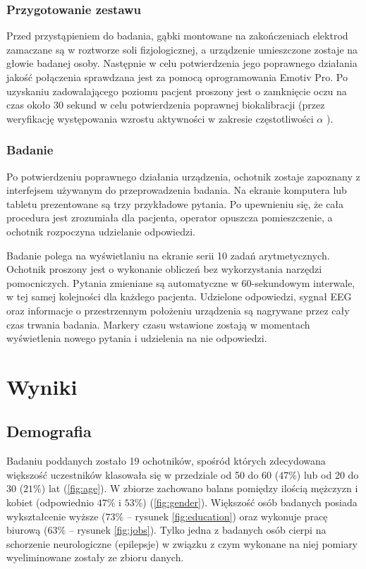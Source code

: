 \documentclass{./assets/wfis}
\begin{document}
\subsection{Przygotowanie zestawu}
Przed przystąpieniem do badania, gąbki montowane na zakończeniach elektrod zamaczane są w roztworze soli fizjologicznej, a urządzenie umieszczone zostaje na głowie badanej osoby. Następnie w celu potwierdzenia jego poprawnego działania jakość połączenia sprawdzana jest za pomocą oprogramowania Emotiv Pro\cite{emotiv_inc_epoc_nodate}. Po uzyskaniu zadowalającego poziomu pacjent proszony jest o zamknięcie oczu na czas około 30 sekund w celu potwierdzenia poprawnej biokalibracji (przez weryfikację występowania wzrostu aktywności w zakresie częstotliwości $\alpha$ \cite{britton_electroencephalography_2016}).

\subsection{Badanie}
Po potwierdzeniu poprawnego działania urządzenia, ochotnik zostaje zapoznany z interfejsem używanym do przeprowadzenia badania. Na ekranie komputera lub tabletu prezentowane są trzy przykładowe pytania. Po upewnieniu się, że cała procedura jest zrozumiała dla pacjenta, operator opuszcza pomieszczenie, a ochotnik rozpoczyna udzielanie odpowiedzi.

Badanie polega na wyświetlaniu na ekranie  serii 10 zadań arytmetycznych. Ochotnik proszony jest o wykonanie obliczeń bez wykorzystania narzędzi pomocniczych. Pytania zmieniane są automatyczne w 60-sekundowym interwale, w tej samej kolejności dla każdego pacjenta. Udzielone odpowiedzi, sygnał EEG oraz informacje o przestrzennym położeniu urządzenia są nagrywane przez cały czas trwania badania. Markery czasu wstawione zostają w momentach wyświetlenia nowego pytania i udzielenia na nie odpowiedzi.


\chapter{Wyniki}
\section{Demografia}
Badaniu poddanych zostało 19 ochotników, spośród których zdecydowana większość uczestników klasowała się w przedziale od 50 do 60 ($47\%$) lub od 20 do 30 ($21\%$) lat (\autoref{fig:age}). W zbiorze zachowano balans pomiędzy ilością mężczyzn i kobiet (odpowiednio $47\%$ i $53\%$) (\autoref{fig:gender}). Większość osób badanych posiada wykształcenie wyższe ($73\%$ – rysunek \ref{fig:education}) oraz wykonuje pracę biurową ($63\%$ – rysunek \ref{fig:jobs}). Tylko jedna z badanych osób cierpi na schorzenie neurologiczne (epilepsje) w związku z czym wykonane na niej pomiary  wyeliminowane zostały ze zbioru danych.
\end{document}
